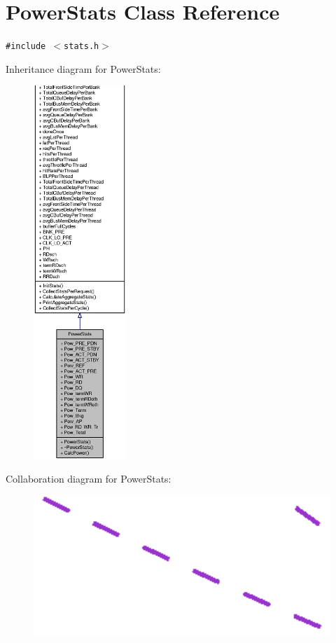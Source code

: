 \section{PowerStats Class Reference}
\label{classPowerStats}
{\tt \#include $<$stats.h$>$}

Inheritance diagram for PowerStats:\nopagebreak
\begin{figure}[H]
\begin{center}
\leavevmode
\includegraphics[height=400pt]{classPowerStats__inherit__graph}
\end{center}
\end{figure}
Collaboration diagram for PowerStats:\nopagebreak
\begin{figure}[H]
\begin{center}
\leavevmode
\includegraphics[width=400pt]{classPowerStats__coll__graph}
\end{center}
\end{figure}
